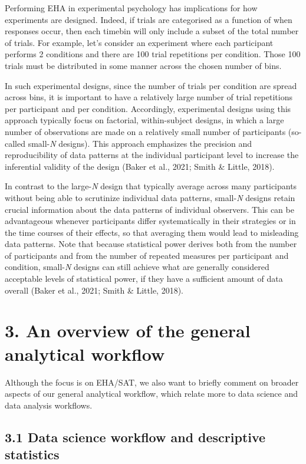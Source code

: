 \documentclass[
  man, donotrepeattitle,floatsintext]{apa6}
\begin{document}
Performing EHA in experimental psychology has implications for how experiments are designed. Indeed, if trials are categorised as a function of when responses occur, then each timebin will only include a subset of the total number of trials. For example, let's consider an experiment where each participant performs 2 conditions and there are 100 trial repetitions per condition. Those 100 trials must be distributed in some manner across the chosen number of bins.

In such experimental designs, since the number of trials per condition are spread across bins, it is important to have a relatively large number of trial repetitions per participant and per condition. Accordingly, experimental designs using this approach typically focus on factorial, within-subject designs, in which a large number of observations are made on a relatively small number of participants (so-called small-\emph{N} designs). This approach emphasizes the precision and reproducibility of data patterns at the individual participant level to increase the inferential validity of the design (Baker et al., 2021; Smith \& Little, 2018).

In contrast to the large-\emph{N} design that typically average across many participants without being able to scrutinize individual data patterns, small-\emph{N} designs retain crucial information about the data patterns of individual observers. This can be advantageous whenever participants differ systematically in their strategies or in the time courses of their effects, so that averaging them would lead to misleading data patterns. Note that because statistical power derives both from the number of participants and from the number of repeated measures per participant and condition, small-\emph{N} designs can still achieve what are generally considered acceptable levels of statistical power, if they have a sufficient amount of data overall (Baker et al., 2021; Smith \& Little, 2018).

\section{3. An overview of the general analytical workflow}\label{an-overview-of-the-general-analytical-workflow}

Although the focus is on EHA/SAT, we also want to briefly comment on broader aspects of our general analytical workflow, which relate more to data science and data analysis workflows.

\subsection{3.1 Data science workflow and descriptive statistics}\label{data-science-workflow-and-descriptive-statistics}
\end{document}
